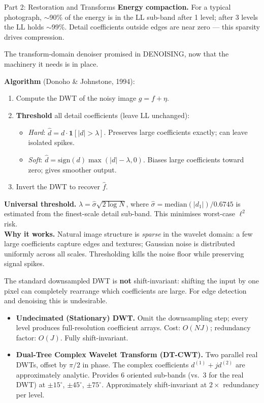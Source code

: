 \documentclass[letterpaper]{article}
\begin{document}
\begin{notes}{Part 2: Restoration and Transforms}
\textbf{Energy compaction.} For a typical photograph, $\sim$90\% of the energy is in the LL sub-band after 1 level; after 3 levels the LL holds $\sim$99\%. Detail coefficients outside edges are near zero — this sparsity drives compression.


The transform-domain denoiser promised in DENOISING, now that the machinery it needs is in place.

\textbf{Algorithm} (Donoho \& Johnstone, 1994):
\begin{enumerate}
    \item Compute the DWT of the noisy image $g = f + \eta$.
    \item \textbf{Threshold} all detail coefficients (leave LL unchanged):
    \begin{itemize}
        \item \emph{Hard}: $\hat{d} = d\cdot\mathbf{1}[|d|>\lambda]$. Preserves large coefficients exactly; can leave isolated spikes.
        \item \emph{Soft}: $\hat{d} = \mathrm{sign}(d)\max(|d|-\lambda,0)$. Biases large coefficients toward zero; gives smoother output.
    \end{itemize}
    \item Invert the DWT to recover $\hat{f}$.
\end{enumerate}
\textbf{Universal threshold.} $\lambda = \hat\sigma\sqrt{2\log N}$, where $\hat\sigma = \mathrm{median}(|d_1|)/0.6745$ is estimated from the finest-scale detail sub-band. This minimises worst-case $\ell^2$ risk.\\

\textbf{Why it works.} Natural image structure is \emph{sparse} in the wavelet domain: a few large coefficients capture edges and textures; Gaussian noise is distributed uniformly across all scales. Thresholding kills the noise floor while preserving signal spikes.



The standard downsampled DWT is \textbf{not} shift-invariant: shifting the input by one pixel can completely rearrange which coefficients are large. For edge detection and denoising this is undesirable.

\begin{itemize}
    \item \textbf{Undecimated (Stationary) DWT.} Omit the downsampling step; every level produces full-resolution coefficient arrays. Cost: $O(N J)$; redundancy factor: $O(J)$. Fully shift-invariant.
    \item \textbf{Dual-Tree Complex Wavelet Transform (DT-CWT).} Two parallel real DWTs, offset by $\pi/2$ in phase. The complex coefficients $d^{(1)} + jd^{(2)}$ are approximately analytic. Provides 6 oriented sub-bands (vs.\ 3 for the real DWT) at $\pm15^\circ$, $\pm45^\circ$, $\pm75^\circ$. Approximately shift-invariant at $2\times$ redundancy per level.
\end{itemize}


\end{notes}
\end{document}
